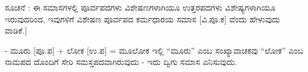 \indent {[}ಸೂಚನೆ : ಈ ಸಮಾಸಗಳಲ್ಲಿ ಪೂರ್ವಪದಗಳು ವಿಶೇಷಣಗಳಾಗಿಯೂ ಉತ್ತರಪದಗಳು ವಿಶೇಷ್ಯಗಳಾಗಿಯೂ ಇರುವುದರಿಂದ, ಇವುಗಳಿಗೆ ವಿಶೇಷಣ ಪೂರ್ವಪದ ಕರ್ಮಧಾರಯ ಸಮಾಸ {[}ವಿ.ಪೂ.ಕ{]} ವೆಂದು ಹೇಳುವುದು ವಾಡಿಕೆ.{]}\par


\indent - ಮೂರು {[}ಪೂ.ಪ{]} + ಲೋಕ {[}ಉ.ಪ{]} = ಮೂಲೋಕ ಇಲ್ಲಿ “ಮೂರು” ಎಂಬ ಸಂಖ್ಯಾವಾಚಕವು “ಲೋಕ” ಎಂಬ ನಾಮಪದ ದೊಂದಿಗೆ ಸೇರಿ ಸಮಸ್ತಪದವಾಗಿರುವುದು - ಇದು ದ್ವಿಗು ಸಮಾಸ ಎನಿಸುವುದು.\par

